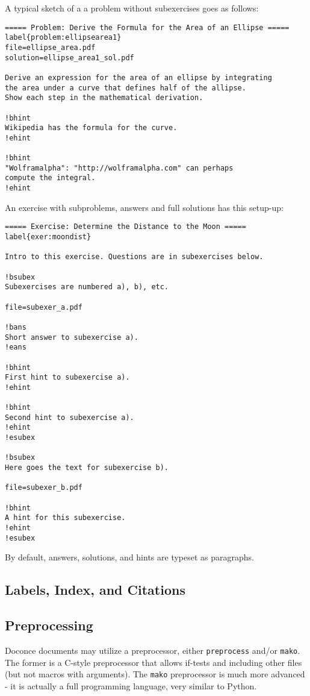 \documentclass[twoside]{article}
\begin{document}
\noindent
A typical sketch of a a problem without subexercises goes as follows:
\begin{Verbatim}
===== Problem: Derive the Formula for the Area of an Ellipse =====
label{problem:ellipsearea1}
file=ellipse_area.pdf
solution=ellipse_area1_sol.pdf

Derive an expression for the area of an ellipse by integrating
the area under a curve that defines half of the allipse.
Show each step in the mathematical derivation.

!bhint
Wikipedia has the formula for the curve.
!ehint

!bhint
"Wolframalpha": "http://wolframalpha.com" can perhaps
compute the integral.
!ehint
\end{Verbatim}
An exercise with subproblems, answers and full solutions has this
setup-up:
\begin{Verbatim}
===== Exercise: Determine the Distance to the Moon =====
label{exer:moondist}

Intro to this exercise. Questions are in subexercises below.

!bsubex
Subexercises are numbered a), b), etc.

file=subexer_a.pdf

!bans
Short answer to subexercise a).
!eans

!bhint
First hint to subexercise a).
!ehint

!bhint
Second hint to subexercise a).
!ehint
!esubex

!bsubex
Here goes the text for subexercise b).

file=subexer_b.pdf

!bhint
A hint for this subexercise.
!ehint
!esubex
\end{Verbatim}
By default, answers, solutions, and hints are typeset as paragraphs.

\subsection{Labels, Index, and Citations}

\subsection{Preprocessing}

Doconce documents may utilize a preprocessor, either {\fontsize{10pt}{10pt}\verb!preprocess!} and/or
{\fontsize{10pt}{10pt}\verb!mako!}. The former is a C-style preprocessor that allows if-tests
and including other files (but not macros with arguments).
The {\fontsize{10pt}{10pt}\verb!mako!} preprocessor is much more advanced - it is actually a full
programming language, very similar to Python.
\end{document}
